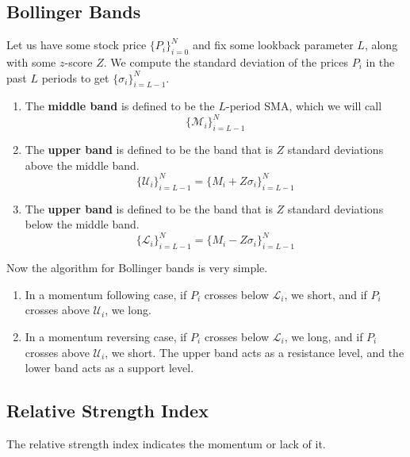 \documentclass{article}
\begin{document}
  \subsection{Bollinger Bands}

    \begin{definition}
      Let us have some stock price $\{P_i\}_{i=0}^N$ and fix some lookback parameter $L$, along with some $z$-score $Z$. We compute the standard deviation of the prices $P_i$ in the past $L$ periods to get $\{\sigma_i\}_{i=L-1}^N$. 
      \begin{enumerate}
        \item The \textbf{middle band} is defined to be the $L$-period SMA, which we will call 
        \[\{\mathcal{M}_i\}_{i=L-1}^N\] 
        \item The \textbf{upper band} is defined to be the band that is $Z$ standard deviations above the middle band. 
        \[\{\mathcal{U}_i\}_{i=L-1}^N = \{M_i + Z \sigma_i\}_{i=L-1}^N\]
        \item The \textbf{upper band} is defined to be the band that is $Z$ standard deviations below the middle band. 
        \[\{\mathcal{L}_i\}_{i=L-1}^N = \{M_i - Z \sigma_i\}_{i=L-1}^N\]
      \end{enumerate}
    \end{definition}

    Now the algorithm for Bollinger bands is very simple. 
    \begin{enumerate}
      \item In a momentum following case, if $P_i$ crosses below $\mathcal{L}_i$, we short, and if $P_i$ crosses above $\mathcal{U}_i$, we long. 

      \item In a momentum reversing case, if $P_i$ crosses below $\mathcal{L}_i$, we long, and if $P_i$ crosses above $\mathcal{U}_i$, we short. The upper band acts as a resistance level, and the lower band acts as a support level. 
    \end{enumerate}

  \subsection{Relative Strength Index}

    The relative strength index indicates the momentum or lack of it. 
\end{document}
